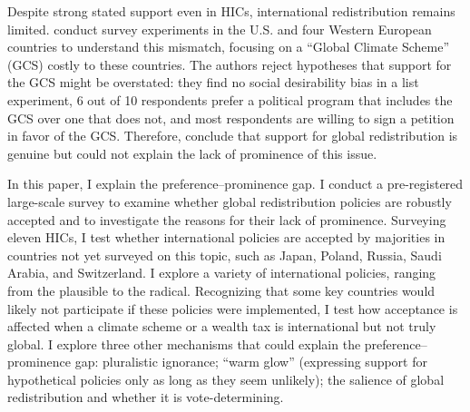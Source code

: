 \documentclass[12pt,english]{article}
\begin{document}
\begin{bibunit}
Despite strong stated support even in HICs, international redistribution remains limited. 
\cite{fabre_majority_2025} conduct survey experiments in the U.S. and four Western European countries to understand this mismatch, focusing on a ``Global Climate Scheme'' (GCS) costly to these countries. The authors reject hypotheses that support for the GCS might be overstated: they find no social desirability bias in a list experiment, 6 out of 10 respondents prefer a political program that includes the GCS over one that does not, and most respondents are willing to sign a petition in favor of the GCS.
Therefore, \cite{fabre_majority_2025} conclude that support for global redistribution is genuine but could not explain the lack of prominence of this issue.

In this paper, I explain the preference--prominence gap. I conduct a pre-registered large-scale survey to examine whether global redistribution policies are robustly accepted and to investigate the reasons for their lack of prominence. Surveying eleven HICs, I test whether international policies are accepted by majorities in countries not yet surveyed on this topic, such as Japan, Poland, Russia, Saudi Arabia, and Switzerland. I explore a variety of international policies, ranging from the plausible to the radical. Recognizing that some key countries would likely not participate if these policies were implemented, I test how acceptance is affected when a climate scheme or a wealth tax is international but not truly global. I explore three other mechanisms that could explain the preference--prominence gap: pluralistic ignorance; ``warm glow'' (expressing support for hypothetical policies only as long as they seem unlikely); the salience of global redistribution and whether it is vote-determining.



\end{bibunit}
\end{document}
